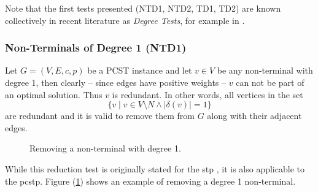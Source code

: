  Note that the first tests presented (NTD1, NTD2, TD1, TD2) are known collectively
 in recent literature as \textit{Degree Tests}, for example in \cite{rehfeldt2016reduction}.
\subsubsection{Non-Terminals of Degree 1 (NTD1)}
\label{sec:red:test:deg1}
Let $G = (V, E, c, p)$ be a PCST instance and let $v \in V$ be any non-terminal with degree 1, then
 clearly -- since edges have positive weights -- $v$ can not be part of an optimal solution. Thus $v$ is redundant. In other words,
 all vertices in the set
 $$\{v \mid v \in V \setminus N \wedge |\delta(v)| = 1\}$$
 are redundant and it is valid to remove them from $G$ along with their adjacent edges.

\begin{figure}[h]\centering
  \caption{Removing a non-terminal with degree 1.}
  \label{fig:red:test:deg1}
\end{figure}

 While this reduction test is originally stated for the \gls{stp} \citep{hwang1992steiner}, it is also applicable to the \gls{pcstp}. Figure (\ref{fig:red:test:deg1})
  shows an example of removing a degree 1 non-terminal.

